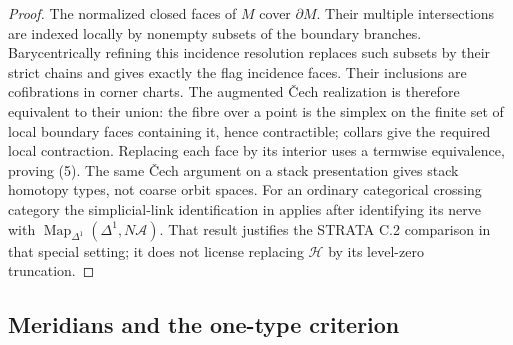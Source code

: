 \begin{proof}
The normalized closed faces of $M$ cover $\partial M$.  Their multiple
intersections are indexed locally by nonempty subsets of the boundary
branches.  Barycentrically refining this incidence resolution replaces
such subsets by their strict chains and gives exactly the flag incidence
faces.  Their inclusions are
cofibrations in corner charts.  The augmented Čech realization is
therefore equivalent to their union: the fibre over a point is the
simplex on the finite set of local boundary faces containing it, hence
contractible; collars give the required local contraction.  Replacing
each face by its interior uses a termwise equivalence, proving (5).
The same Čech argument on a stack presentation gives stack homotopy
types, not coarse orbit spaces.  For an ordinary categorical crossing
category the simplicial-link identification in
\citet[Theorem 6.1]{DouteauWaas2022} applies after identifying its nerve
with $\operatorname{Map}_{\Delta^1}(\Delta^1,N\mathcal A)$.
That result justifies the STRATA C.2 comparison in that special setting;
it does not license replacing $\mathcal H$ by its level-zero truncation.
\end{proof}

\subsection{Meridians and the one-type criterion}

